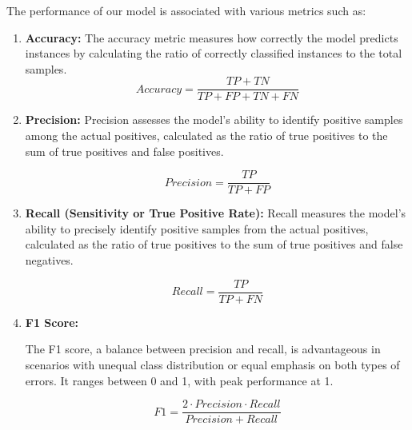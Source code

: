 The performance of our model is associated with various metrics such as:
\begin{enumerate}
    \item \textbf{Accuracy:}
          The accuracy metric measures how correctly the model predicts instances by calculating the ratio of correctly classified instances to the total samples.
          \[ Accuracy = \frac{TP + TN}{TP + FP + TN + FN} \]

    \item \textbf{Precision:}
          Precision assesses the model's ability to identify positive samples among the actual positives, calculated as the ratio of true positives to the sum of true positives and false positives.

          \[ Precision = \frac{TP}{TP + FP} \]

    \item \textbf{Recall (Sensitivity or True Positive Rate):}
          Recall measures the model's ability to precisely identify positive samples from the actual positives, calculated as the ratio of true positives to the sum of true positives and false negatives.

          \[ Recall = \frac{TP}{TP + FN} \]


    \item \textbf{F1 Score:}

          The F1 score, a balance between precision and recall, is advantageous in scenarios with unequal class distribution or equal emphasis on both types of errors. It ranges between 0 and 1, with peak performance at 1.

          \[ F1 = \frac{2 \cdot Precision \cdot Recall}{Precision + Recall} \]

\end{enumerate}
\newpage
